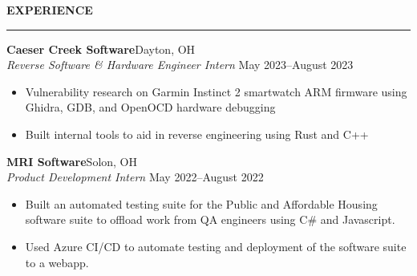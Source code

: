 \documentclass[notitlepage,10pt,a4paper]{article}
\newenvironment{resumesection}[1]{
    \header{#1}
}{}
\newcommand{\header}[1]{
    \vspace{2pt}
    \textcolor{accent1}{\Large \textbf{#1}}
    \vspace{6pt}\hrule\vspace{4pt}
}
\newcommand{\TECH}{
    \textcolor{accent3}{\small\textbf{SKILLS}}\small\,
}
\newcommand{\thingsep}{
    \vspace{4pt}
}
\begin{document}
\begin{resumesection}{EXPERIENCE}
    \textcolor{accent2}{\textbf{\large{Caeser Creek Software}}}\hfill\normalsize Dayton, OH\\
    \textit{Reverse Software \& Hardware Engineer Intern} \hfill\small May 2023--August 2023
    \begin{itemize}[noitemsep, font=\small, label={-}, leftmargin=*, topsep=0pt, partopsep=0pt]
        \item Vulnerability research on Garmin Instinct 2 smartwatch ARM firmware using Ghidra, GDB, and OpenOCD hardware debugging
        \item Built internal tools to aid in reverse engineering using Rust and C++
    \end{itemize}
    \thingsep

    \textcolor{accent2}{\textbf{\large{MRI Software}}}\hfill\normalsize Solon, OH\\
    \textit{Product Development Intern} \hfill\small May 2022--August 2022
    \begin{itemize}[noitemsep, font=\small, label={-}, leftmargin=*, topsep=0pt, partopsep=0pt]
        \item Built an automated testing suite for the Public and Affordable Housing software suite to offload work from QA engineers using C\# and Javascript.
        \item Used Azure CI/CD to automate testing and deployment of the software suite to a webapp.
    \end{itemize}
    \thingsep


\end{resumesection}
\end{document}
